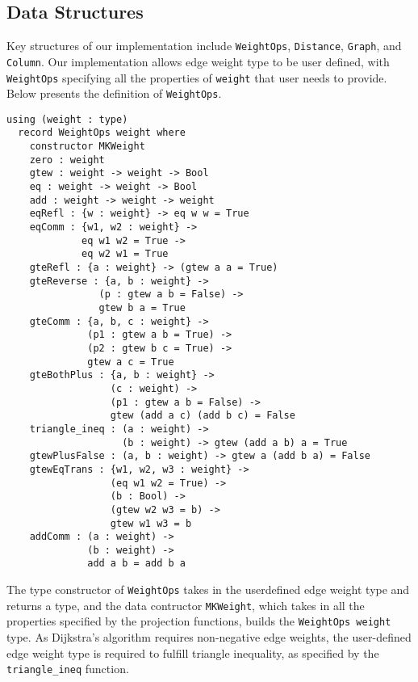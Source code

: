 \subsection{Data Structures}
Key structures of our implementation include \texttt{WeightOps}, \texttt{Distance}, \texttt{Graph}, and \texttt{Column}. Our implementation allows edge weight type to be user defined, with \texttt{WeightOps} specifying all the properties of \texttt{weight} that user needs to provide. Below presents the definition of \texttt{WeightOps}. 
\newline
\begin{lstlisting}
using (weight : type)
  record WeightOps weight where
    constructor MKWeight
    zero : weight
    gtew : weight -> weight -> Bool
    eq : weight -> weight -> Bool
    add : weight -> weight -> weight
    eqRefl : {w : weight} -> eq w w = True
    eqComm : {w1, w2 : weight} -> 
    	     eq w1 w2 = True -> 
    	     eq w2 w1 = True
    gteRefl : {a : weight} -> (gtew a a = True)
    gteReverse : {a, b : weight} -> 
    			(p : gtew a b = False) -> 
    			gtew b a = True
    gteComm : {a, b, c : weight} ->
              (p1 : gtew a b = True) ->
              (p2 : gtew b c = True) ->
              gtew a c = True
    gteBothPlus : {a, b : weight} ->
                  (c : weight) ->
                  (p1 : gtew a b = False) ->
                  gtew (add a c) (add b c) = False
    triangle_ineq : (a : weight) -> 
    				(b : weight) -> gtew (add a b) a = True
    gtewPlusFalse : (a, b : weight) -> gtew a (add b a) = False
    gtewEqTrans : {w1, w2, w3 : weight} -> 
    			  (eq w1 w2 = True) -> 
    			  (b : Bool) -> 
    			  (gtew w2 w3 = b) -> 
    			  gtew w1 w3 = b
    addComm : (a : weight) -> 
    		  (b : weight) -> 
    		  add a b = add b a
\end{lstlisting}
The type constructor of \texttt{WeightOps} takes in the userdefined edge weight type and returns a type, and the data contructor \texttt{MKWeight}, which takes in all the properties specified by the projection functions, builds the \texttt{WeightOps weight} type. As Dijkstra's algorithm requires non-negative edge weights, the user-defined edge weight type is required to fulfill triangle inequality, as specified by the \texttt{triangle\_ineq} function. 
\\

